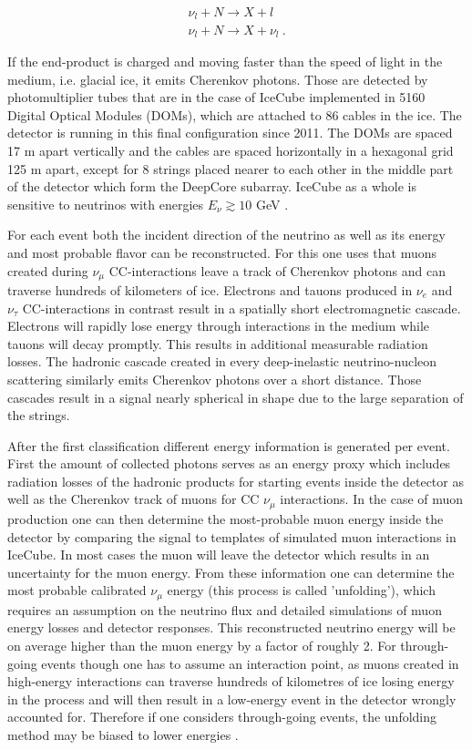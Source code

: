 \documentclass[%
 reprint,
 preprintnumbers,
 nofootinbib,
 amsmath,amssymb,
 aps,
]{revtex4-2}
\begin{document}
\begin{eqnarray}
\nu_l + N \rightarrow X + l
\label{subeq:cc}
\\
\nu_l + N \rightarrow X + \nu_l \ .
\label{subeq:nc}
\end{eqnarray}

If the end-product is charged and moving faster than the speed of light in the medium, i.e. glacial ice, it emits Cherenkov photons. Those are detected by photomultiplier tubes that are in the case of IceCube implemented in 5160 Digital Optical Modules (DOMs), which are attached to 86 cables in the ice. The detector is running in this final configuration since 2011. The DOMs are spaced 17 m apart vertically and the cables are spaced horizontally in a hexagonal grid 125 m apart, except for 8 strings placed nearer to each other in the middle part of the detector which form the DeepCore subarray. IceCube as a whole is sensitive to neutrinos with energies  $E_\nu \gtrsim 10$ GeV \cite{Abbasi_2009,greater1TeV}.

For each event both the incident direction of the neutrino as well as its energy and most probable flavor can be reconstructed. For this one uses that muons created during $\nu_\mu$ CC-interactions leave a track of Cherenkov photons and can traverse hundreds of kilometers of ice. Electrons and tauons produced in $\nu_e$ and $\nu_\tau$ CC-interactions in contrast result in a spatially short electromagnetic cascade. Electrons will rapidly lose energy through interactions in the medium while tauons will decay promptly. This results in additional measurable radiation losses. The hadronic cascade created in every deep-inelastic neutrino-nucleon scattering similarly emits Cherenkov photons over a short distance. Those cascades result in a signal nearly spherical in shape due to the large separation of the strings.

After the first classification different energy information is generated per event. First the amount of collected photons serves as an energy proxy which includes radiation losses of the hadronic products for starting events inside the detector as well as the Cherenkov track of muons for CC $\nu_\mu$ interactions. In the case of muon production one can then determine the most-probable muon energy inside the detector by comparing the signal to templates of simulated muon interactions in IceCube. In most cases the muon will leave the detector which results in an uncertainty for the muon energy. From these information one can determine the most probable calibrated $\nu_\mu$ energy (this process is called 'unfolding'), which requires an assumption on the neutrino flux and detailed simulations of muon energy losses and detector responses. This reconstructed neutrino energy will be on average higher than the muon energy by a factor of roughly 2. For through-going events though one has to assume an interaction point, as muons created in high-energy interactions can traverse hundreds of kilometres of ice losing energy in the process and will then result in a low-energy event in the detector wrongly accounted for. Therefore if one considers through-going events, the unfolding method may be biased to lower energies \cite{Becker_2008,greater1TeV,2yearAstro}. 
\end{document}
